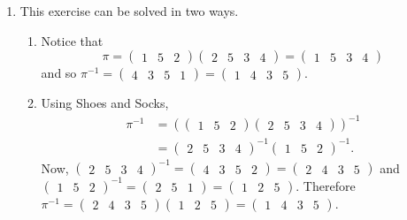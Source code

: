 \begin{enumerate}
    \item This exercise can be solved in two ways.
    \begin{enumerate}
        \item Notice that
        \[
            \pi = \begin{pmatrix}1 & 5 & 2\end{pmatrix}\begin{pmatrix}2 & 5 & 3 & 4\end{pmatrix} = \begin{pmatrix}1 & 5 & 3 & 4 \end{pmatrix}
        \]
        and so $\pi^{-1} = \begin{pmatrix}4 & 3 & 5 & 1\end{pmatrix} = \begin{pmatrix}1 & 4 & 3 & 5\end{pmatrix}$.
        \item Using Shoes and Socks,
        \begin{align*}
            \pi^{-1} &= \left(\begin{pmatrix}1 & 5 & 2\end{pmatrix}\begin{pmatrix}2 & 5 & 3 & 4\end{pmatrix}\right)^{-1}\\
            &= \begin{pmatrix}2 & 5 & 3 & 4\end{pmatrix}^{-1} \begin{pmatrix}1 & 5 & 2\end{pmatrix}^{-1}.
        \end{align*}
        Now, $\begin{pmatrix}2 & 5 & 3 & 4\end{pmatrix}^{-1} = \begin{pmatrix}4 & 3 & 5 & 2\end{pmatrix} = \begin{pmatrix}2 & 4 & 3 & 5\end{pmatrix}$ and $\begin{pmatrix}1 & 5 & 2\end{pmatrix}^{-1} = \begin{pmatrix}2 & 5 & 1\end{pmatrix} = \begin{pmatrix}1 & 2 & 5\end{pmatrix}$. Therefore $\pi^{-1} = \begin{pmatrix}2 & 4 & 3 & 5\end{pmatrix}\begin{pmatrix}1 & 2 & 5\end{pmatrix} = \begin{pmatrix}1 & 4 & 3 & 5\end{pmatrix}$.
    \end{enumerate}


\end{enumerate}
